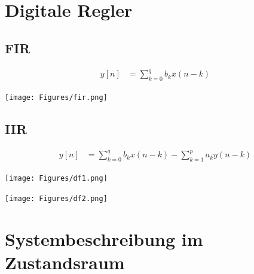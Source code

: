 \documentclass[10pt,a4paper]{article}
\begin{document}
  \section{Digitale Regler}
  \subsection{FIR}
  \begin{mdframed}[style=exercise]
    \begin{align}
      y[n] &= \sum_{k=0}^{q} b_k x(n-k)
    \end{align}
  \end{mdframed}
  \begin{center}
    \texttt{[image: Figures/fir.png]}
  \end{center}
  \subsection{IIR}
  \begin{mdframed}[style=exercise]
    \begin{align}
      y[n] &= \sum_{k=0}^{q} b_k x(n-k) - \sum_{k=1}^{p} a_k y(n-k)
    \end{align}
  \end{mdframed}
  \begin{center}
    \texttt{[image: Figures/df1.png]}
  \end{center}
  \begin{center}
    \texttt{[image: Figures/df2.png]}
  \end{center}
  \section{Systembeschreibung im Zustandsraum}
\end{document}
